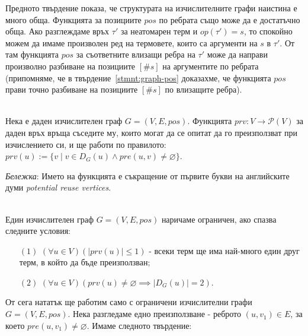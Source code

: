 \documentclass[12pt,twoside,a4paper]{article}
\begin{document}
	Предното твърдение показа, че структурата на изчислителните графи наистина е много обща. Функцията за позициите $pos$ по ребрата също може да е достатъчно обща. Ако разглеждаме връх $\tau'$ за неатомарен терм и $op(\tau')=s$, то спокойно можем да имаме произволен ред на термовете, които са аргументи на $s$ в $\tau'$. От там функцията $pos$ за съответните влизащи ребра на $\tau'$ може да направи произволно разбиване на позициите $[\#s]$ на аргументите по ребрата (припомняме, че в твърдение~\ref{stmnt:graph-pos} доказахме, че функцията $pos$ прави точно разбиване на позициите $[\#s]$ по влизащите ребра).
	
	\begin{definition}\label{def:prv}~\\
		\indent Нека е даден изчислителен граф $G=(V,E,pos)$. Функцията $prv\colon V \to \mathcal{P}(V)$ за даден връх връща съседите му, които могат да се опитат да го преизползват при изчислението си, и ще работи по правилото: $prv(u):=\{v \mid v \in D_G(u) \land pre(u,v) \neq \varnothing\}$.
		
		\textit{Бележка}: Името на функцията е съкращение от първите букви на английските думи \textit{potential reuse vertices}.
	\end{definition}
	
	\begin{definition}\label{def:restricted-graph}~\\
		\indent Един изчислителен граф $G=(V,E,pos)$ наричаме ограничен, ако спазва следните условия:
		\begin{itemize}
			\item[$(1)$] $(\forall u \in V)(|prv(u)| \le 1)$ - всеки терм ще има най-много един друг терм, в който да бъде преизползван;
			\item[$(2)$] $(\forall u \in V)(prv(u) \neq \varnothing \implies |D_G(u)| = 2)$.
		\end{itemize}
	\end{definition}
	
	\newpage
	От сега нататък ще работим само с ограничени изчислителни графи $G=(V,E,pos)$. Нека разгледаме едно преизползване - реброто $(u,v_1) \in E$, за което $pre(u,v_1) \neq \varnothing$. Имаме следното твърдение:
	
\end{document}
